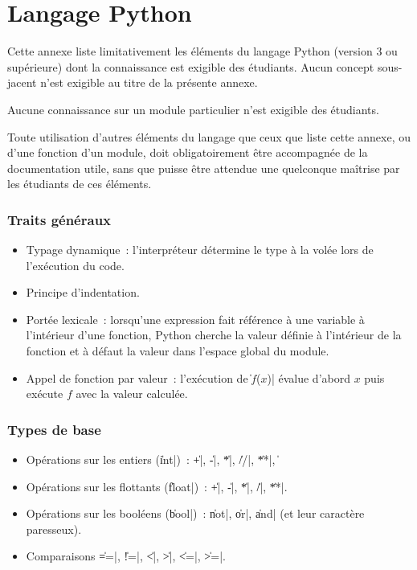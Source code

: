 \section{Langage Python}
Cette annexe liste limitativement les éléments du langage Python (version 3 ou supérieure) dont la connaissance est exigible des étudiants. Aucun concept sous-jacent n'est exigible au titre de la présente annexe.

Aucune connaissance sur un module particulier n'est exigible des étudiants.

Toute utilisation d'autres éléments du langage que ceux que liste cette annexe, ou d'une fonction d'un module, doit obligatoirement être accompagnée de la documentation utile, sans que puisse être attendue une quelconque maîtrise par les étudiants de ces éléments.

\subsubsection*{Traits généraux}
\begin{itemize}
\item Typage dynamique~: l'interpréteur détermine le type à la volée lors de l'exécution du code.
\item Principe d'indentation.
\item Portée lexicale~: lorsqu'une expression fait référence à une variable à l'intérieur d'une fonction, Python cherche la valeur définie à l'intérieur de la fonction et à défaut la valeur dans l'espace global du module.
\item Appel de fonction par valeur~: l'exécution de \|$f$($x$)|\! évalue d'abord $x$ puis exécute $f$ avec la valeur calculée.
\end{itemize}

\subsubsection*{Types de base}
\begin{itemize}
\item Opérations sur les entiers (\|int|)~: \|+|, \|-|, \|*|, \|//|, \|**|, \|%
\item Opérations sur les flottants (\|float|)~: \|+|, \|-|, \|*|, \|/|, \|**|.
\item Opérations sur les booléens (\|bool|)~: \|not|, \|or|, \|and| (et leur caractère paresseux).
\item Comparaisons \|==|, \|!=|, \|<|, \|>|, \|<=|, \|>=|.
\end{itemize}

